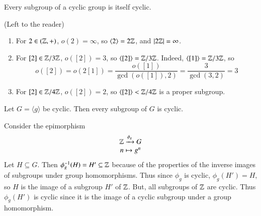\documentclass[12pt, a4paper, twoside, openright, titlepage]{book}
\begin{document}
\begin{thm}{}{}
    Every subgroup of a cyclic group is itself cyclic.
    \begin{proof*}{}{}
        (Left to the reader)
    \end{proof*}
\end{thm}

\begin{eg}{}{}
    \leavevmode
    \begin{enumerate}
        \item For $2 \in (
        \mathbb Z,+)$, $o(2) = \infty$, so $\langle 2 \rangle = 2\mathbb Z$, and $|2\mathbb Z| = \infty$.
        \item For $[2] \in \mathbb Z/3\mathbb Z$, $o([2]) = 3$, so $\langle [2]\rangle = \mathbb Z/3\mathbb Z$. Indeed, $\langle [1]\rangle = \mathbb Z/3\mathbb Z$, so $$o([2]) = o(2[1]) = \frac{o([1])}{\gcd(o([1]),2)} = \frac{3}{\gcd(3,2)} = 3$$
        \item For $[2] \in \mathbb Z/4\mathbb Z$, $o([2]) = 2$, so $\langle [2] \rangle < \mathbb Z/4\mathbb Z$ is a proper subgroup.
    \end{enumerate}
\end{eg}


\begin{cor}{}{}
        Let $G = \langle g \rangle$ be cyclic. Then every subgroup of $G$ is cyclic.
\end{cor}
\begin{proof*}{}{}
        Consider the epimorphism \begin{equation}
                \begin{array}{c} \mathbb Z\xrightarrow{\phi_g}G \\ n\mapsto g^n \end{array}
        \end{equation}
        Let $H \subseteq G$. Then $\phi^{-1}_g(H) = H' \subseteq \mathbb Z$ because of the properties of the inverse images of subgroups under group homomorphisms. Thus since $\phi_g$ is cyclic, $\phi_g(H') = H$, so $H$ is the image of a subgroup $H'$ of $\mathbb Z$. But, all subgroups of $\mathbb Z$ are cyclic. Thus $\phi_g(H')$ is cyclic since it is the image of a cyclic subgroup under a group homomorphism.
\end{proof*}
\end{document}
